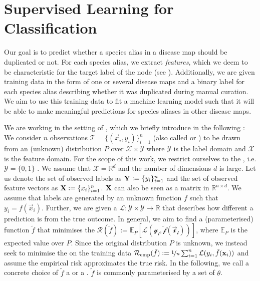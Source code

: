 \documentclass[
	fontsize=10pt, %
	twoside=false, %
	secnumdepth=1, %
  toc=indentunnumbered %
]{kaobook}
\begin{document}
\section{Supervised Learning for Classification}
\label{sec:supervised-learning}
Our goal is to predict whether a species alias in a disease map
should be duplicated or not. For each species alias, we extract 
\textit{features}, which we deem to be characteristic for the target label of
the node (see ).
Additionally, we are given training
data in the form of one or several disease maps and a binary label for each
species alias describing whether it was duplicated during manual curation. We
aim to use this training data to fit a machine learning model such that it will
be able to make meaningful predictions for species aliases in other disease
maps.

We are working in the setting of , which we
briefly introduce in the following
\cite{vapnik_PrinciplesRiskMinimization_,bronstein_geometric_2021}:
We consider $n$ observations $\mathcal{T} = \{(\vec x_i, y_i)\}_{i=1}^n$ (also
called  or ) to be drawn from an (unknown)
distribution $P$ over $\mathcal{X} \times \mathcal{Y}$ where $\mathcal{Y}$ is
the label domain and $\mathcal{X}$ is the feature domain. For the scope of this
work, we restrict ourselves to the , i.e.
$\mathcal{Y} = \{0,1\}$ . We assume that $\mathcal{X} = \mathbb{R}^d$ and the
number of dimensions $d$ is large. Let us denote the set of
observed  labels as $\mat Y := \{y_i\}_{i=1}^n$ and the set of
observed feature vectors as $\mat X := \{x_i\}_{i=1}^n$. $\mat X$ can also be
seen as a matrix in $\mathbb{R}^{n \times d}$.
%
We assume that labels are generated by an unknown function $f$ such that $y_i
= f(\vec x_i)$.
%
Further, we are given a  $\mathcal{L} :
\mathcal{Y} \times \mathcal{Y} \rightarrow \mathbb{R}$ that describes how
different a prediction is from the true outcome.
%
In general, we aim to find a (parameterised) function $\tilde f$ that minimises
the  $\mathcal{R}(\tilde f) := \mathbb{E}_P\left[ \mathcal{L(y_i,
    \tilde f(\vec x_i))} \right]$, where $\mathbb{E}_P$ is the expected value
over $P$.
%
Since the original distribution $P$ is unknown, we instead seek to minimise the 
  on the training data
$\mathcal{R}_{\text{emp}}(\tilde f) := \nicefrac{1}{n}
\sum_{i=1}^n \mathcal{L}(y_i, \tilde f(\vec x_i))$ and assume the empirical risk
approximates the true risk.
%
In the following, we call a concrete choice of $\tilde f$ a  or a
. $\tilde f$ is commonly parameterised by a set of 
$\theta$.
\end{document}

